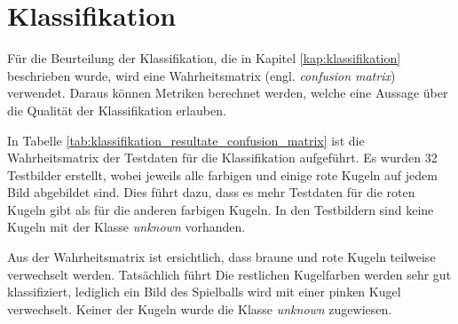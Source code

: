 \section{Klassifikation}
Für die Beurteilung der Klassifikation, die in Kapitel \ref{kap:klassifikation} beschrieben wurde, wird eine
Wahrheitsmatrix\cite{wiki:confusion_matrix} (engl. \emph{confusion matrix}) verwendet.
Daraus können Metriken berechnet werden, welche eine Aussage über die Qualität der Klassifikation erlauben.

In Tabelle \ref{tab:klassifikation_resultate_confusion_matrix} ist die Wahrheitsmatrix der Testdaten
für die Klassifikation aufgeführt. Es wurden 32 Testbilder erstellt, wobei jeweils alle farbigen und einige rote Kugeln
auf jedem Bild abgebildet sind. Dies führt dazu, dass es mehr Testdaten für die roten Kugeln gibt als für die anderen farbigen Kugeln.
In den Testbildern sind keine Kugeln mit der Klasse \emph{unknown} vorhanden.

Aus der Wahrheitsmatrix ist ersichtlich, dass braune und rote Kugeln teilweise verwechselt werden.
Tatsächlich führt
Die restlichen Kugelfarben werden sehr gut klassifiziert, lediglich ein Bild des Spielballs wird mit einer pinken Kugel verwechselt.
Keiner der Kugeln wurde die Klasse \emph{unknown} zugewiesen.

